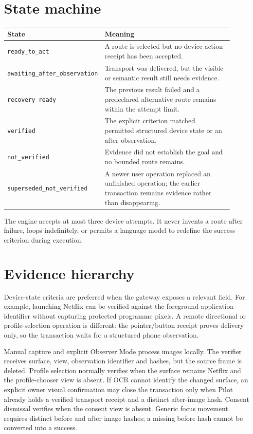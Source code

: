 \documentclass[11pt,a4paper]{article}
\begin{document}
\section{State machine}

\begin{longtable}{p{0.27\linewidth}p{0.65\linewidth}}
\toprule
\textbf{State} & \textbf{Meaning} \\
\midrule
\endhead
\nolinkurl{ready_to_act} & A route is selected but no device action receipt has
been accepted. \\
\nolinkurl{awaiting_after_observation} & Transport was delivered, but the
visible or semantic result still needs evidence. \\
\nolinkurl{recovery_ready} & The previous result failed and a predeclared
alternative route remains within the attempt limit. \\
\nolinkurl{verified} & The explicit criterion matched permitted structured
device state or an after-observation. \\
\nolinkurl{not_verified} & Evidence did not establish the goal and no bounded
route remains. \\
\nolinkurl{superseded_not_verified} & A newer user operation replaced an
unfinished operation; the earlier transaction remains evidence rather than
disappearing. \\
\bottomrule
\end{longtable}

The engine accepts at most three device attempts.  It never invents a route
after failure, loops indefinitely, or permits a language model to redefine the
success criterion during execution.

\section{Evidence hierarchy}

Device-state criteria are preferred when the gateway exposes a relevant field.
For example, launching Netflix can be verified against the foreground
application identifier without capturing protected programme pixels.  A remote
directional or profile-selection operation is different: the pointer/button
receipt proves delivery only, so the transaction waits for a structured phone
observation.

Manual capture and explicit Observer Mode process images locally.  The verifier
receives surface, view, observation identifier and hashes, but the source frame
is deleted.  Profile selection normally verifies when the surface remains Netflix
and the profile-chooser view is absent. If OCR cannot identify the changed surface,
an explicit owner visual confirmation may close the transaction only when Pilot
already holds a verified transport receipt and a distinct after-image hash.
Consent dismissal verifies when the consent
view is absent.  Generic focus movement requires distinct before and after image
hashes; a missing before hash cannot be converted into a success.
\end{document}
